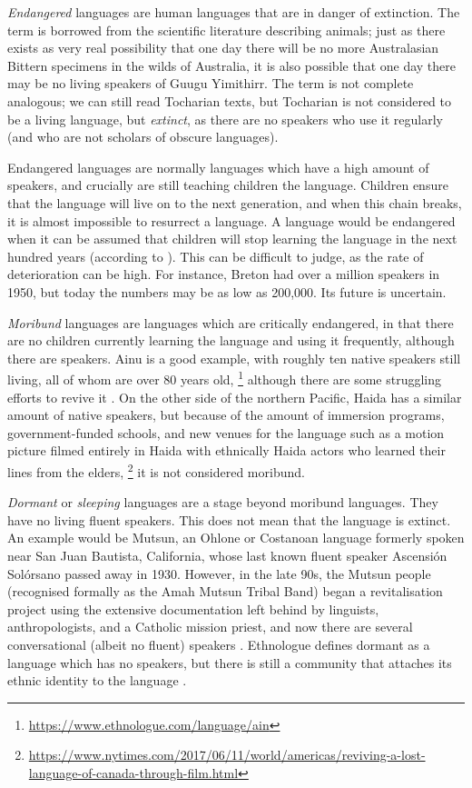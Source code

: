\emph{Endangered} languages are human languages that are in danger of extinction. The term is borrowed from the scientific literature describing animals; just as there exists as very real possibility that one day there will be no more Australasian Bittern specimens in the wilds of Australia, it is also possible that one day there may be no living speakers of Guugu Yimithirr. The term is not complete analogous; we can still read Tocharian texts, but Tocharian is not considered to be a living language, but \textit{extinct}, as there are no speakers who use it regularly (and who are not scholars of obscure languages).

Endangered languages are normally languages which have a high amount of speakers, and crucially are still teaching children the language. Children ensure that the language will live on to the next generation, and when this chain breaks, it is almost impossible to resurrect a language. A language would be endangered when it can be assumed that children will stop learning the language in the next hundred years (according to \citet{krauss92}). This can be difficult to judge, as the rate of deterioration can be high. For instance, Breton had over a million speakers in 1950, but today the numbers may be as low as 200,000. Its future is uncertain.

\emph{Moribund} languages are languages which are critically endangered, in that there are no children currently learning the language and using it frequently, although there are speakers. Ainu is a good example, with roughly ten native speakers still living, all of whom are over 80 years old, \footnote{\href{https://www.ethnologue.com/language/ain}{https://www.ethnologue.com/language/ain}} although there are some struggling efforts to revive it \citep{hanks2017policy}. On the other side of the northern Pacific, Haida has a similar amount of native speakers, but because of the amount of immersion programs, government-funded schools, and new venues for the language such as a motion picture filmed entirely in Haida with ethnically Haida actors who learned their lines from the elders, \footnote{\href{https://www.nytimes.com/2017/06/11/world/americas/reviving-a-lost-language-of-canada-through-film.html}{https://www.nytimes.com/2017/06/11/world/americas/reviving-a-lost-language-of-canada-through-film.html}} it is not considered moribund.

\emph{Dormant} or \textit{sleeping} languages are a stage beyond moribund languages. They have no living fluent speakers. This does not mean that the language is extinct. An example would be Mutsun, an Ohlone or Costanoan language formerly spoken near San Juan Bautista, California, whose last known fluent speaker Ascensi\'on Sol\'orsano passed away in 1930. However, in the late 90s, the Mutsun people (recognised formally as the Amah Mutsun Tribal Band) began a revitalisation project using the extensive documentation left behind by linguists, anthropologists, and a Catholic mission priest, and now there are several conversational (albeit no fluent) speakers \citep{warner2007ethics}. Ethnologue defines dormant as a language which has no speakers, but there is still a community that attaches its ethnic identity to the language \citep{lewis2010assessing}.

